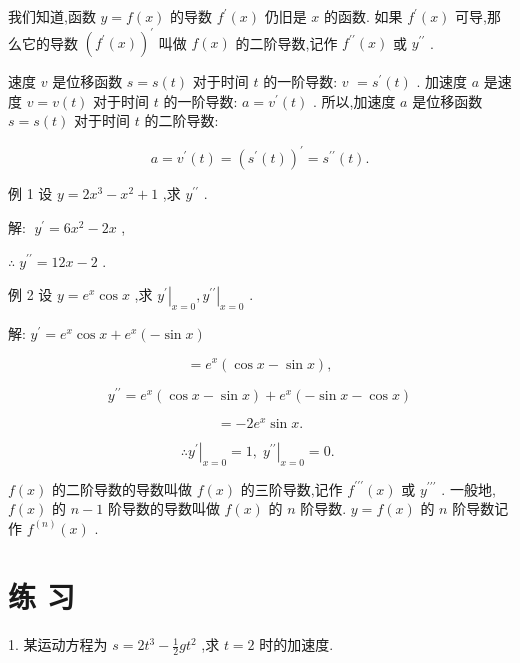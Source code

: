 \documentclass[10pt]{article}
\begin{document}
我们知道,函数 \(y = f\left( x\right)\) 的导数 \({f}^{\prime }\left( x\right)\) 仍旧是 \(x\) 的函数. 如果 \({f}^{\prime }\left( x\right)\) 可导,那么它的导数 \({\left( {f}^{\prime }\left( x\right) \right) }^{\prime }\) 叫做 \(f\left( x\right)\) 的二阶导数,记作 \({f}^{\prime \prime }\left( x\right)\) 或 \({y}^{\prime \prime }\) .

速度 \(v\) 是位移函数 \(s = s\left( t\right)\) 对于时间 \(t\) 的一阶导数: \(v\) \(= {s}^{\prime }\left( t\right)\) . 加速度 \(a\) 是速度 \(v = v\left( t\right)\) 对于时间 \(t\) 的一阶导数: \(a = {v}^{\prime }\left( t\right)\) . 所以,加速度 \(a\) 是位移函数 \(s = s\left( t\right)\) 对于时间 \(t\) 的二阶导数:

\[
a = {v}^{\prime }\left( t\right) = {\left( {s}^{\prime }\left( t\right) \right) }^{\prime } = {s}^{\prime \prime }\left( t\right) .
\]

例 1 设 \(y = 2{x}^{3} - {x}^{2} + 1\) ,求 \({y}^{\prime \prime }\) .

解: \(\;{y}^{\prime } = 6{x}^{2} - {2x}\) ,

\(\therefore \;{y}^{\prime \prime } = {12x} - 2\) .

例 2 设 \(y = {e}^{x}\cos x\) ,求 \({\left. {y}^{\prime }\right| }_{x = 0},{\left. {y}^{\prime \prime }\right| }_{x = 0}\) .

解: \({y}^{\prime } = {e}^{x}\cos x + {e}^{x}\left( {-\sin x}\right)\)

\[
= {e}^{x}\left( {\cos x - \sin x}\right) ,
\]

\[
{y}^{\prime \prime } = {e}^{x}\left( {\cos x - \sin x}\right) + {e}^{x}\left( {-\sin x - \cos x}\right)
\]

\[
= - 2{e}^{x}\sin x\text{.}
\]

\[
\therefore {\left. {y}^{\prime }\right| }_{x = 0} = 1,{\left. \;{y}^{\prime \prime }\right| }_{x = 0} = 0\text{. }
\]

\(f\left( x\right)\) 的二阶导数的导数叫做 \(f\left( x\right)\) 的三阶导数,记作 \({f}^{\prime \prime \prime }\left( x\right)\) 或 \({y}^{\prime \prime \prime }\) . 一般地, \(f\left( x\right)\) 的 \(n - 1\) 阶导数的导数叫做 \(f\left( x\right)\) 的 \(n\) 阶导数. \(y = f\left( x\right)\) 的 \(n\) 阶导数记作 \({f}^{\left( n\right) }\left( x\right)\) .

\section*{练 习}

1. 某运动方程为 \(s = 2{t}^{3} - \frac{1}{2}g{t}^{2}\) ,求 \(t = 2\) 时的加速度.
\end{document}

